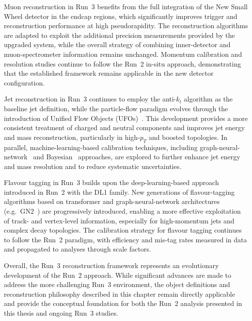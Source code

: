Muon reconstruction in Run~3 benefits from the full integration of the New Small
Wheel detector in the endcap regions, which significantly improves trigger and
reconstruction performance at high pseudorapidity.
The reconstruction algorithms are adapted to exploit the additional precision
measurements provided by the upgraded system, while the overall strategy of
combining inner-detector and muon-spectrometer information remains unchanged.
Momentum calibration and resolution studies continue to follow the Run~2 in-situ
approach, demonstrating that the established framework remains applicable in the
new detector configuration.

Jet reconstruction in Run~3 continues to employ the anti-$k_t$ algorithm as the
baseline jet definition, while the particle-flow paradigm evolves through the
introduction of Unified Flow Objects (UFOs)~\cite{ATLASUFOJetsArxiv2020}.
This development provides a more consistent treatment of charged and neutral
components and improves jet energy and mass reconstruction, particularly in
high-$p_T$ and boosted topologies.
In parallel, machine-learning-based calibration techniques, including
graph-neural-network~\cite{ATLASJetCalibTechniquesArxiv2023} and Bayesian~\cite{ATLASUncertaintyAwareCalibArxiv2024} approaches, are explored to further enhance
jet energy and mass resolution and to reduce systematic uncertainties.

Flavour tagging in Run~3 builds upon the deep-learning-based approach introduced
in Run~2 with the DL1 family.
New generations of flavour-tagging algorithms based on transformer and
graph-neural-network architectures (e.g.\ GN2~\cite{ATLASGN2Arxiv2025}) are progressively introduced, enabling a
more effective exploitation of track- and vertex-level information, especially
for high-momentum jets and complex decay topologies.
The calibration strategy for flavour tagging continues to follow the Run~2
paradigm, with efficiency and mis-tag rates measured in data and propagated to
analyses through scale factors.

Overall, the Run~3 reconstruction framework represents an evolutionary
development of the Run~2 approach.
While significant advances are made to address the more challenging Run~3
environment, the object definitions and reconstruction philosophy described in
this chapter remain directly applicable and provide the conceptual foundation
for both the Run~2 analysis presented in this thesis and ongoing Run~3 studies.